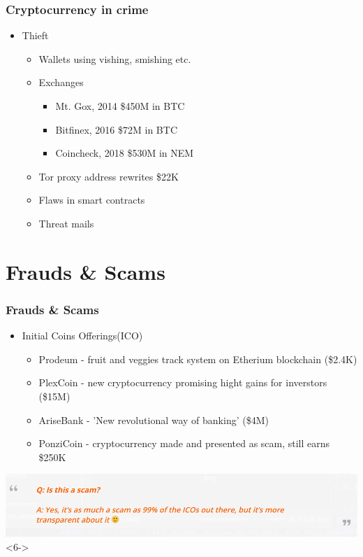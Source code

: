 \documentclass{beamer}
\begin{document}
\begin{frame}
    \frametitle{Cryptocurrency in crime}
        \begin{itemize}
            \item<1-> Thieft
            \begin{itemize}
                \item<2-> Wallets using vishing, smishing etc.
                \item<3-> Exchanges
                    \begin{itemize}
                        \item<4-> Mt. Gox,   2014 \$450M in BTC
                        \item<4-> Bitfinex,  2016 \$72M  in BTC
                        \item<4-> Coincheck, 2018 \$530M in NEM
                    \end{itemize}
                \item<5-> Tor proxy address rewrites \$22K
                \item<6-> Flaws in smart contracts
                \item<7-> Threat mails
            \end{itemize}
        \end{itemize}
\end{frame}
\section{Frauds \& Scams}
\begin{frame}
    \frametitle{Frauds \& Scams}
        \begin{itemize}
            \item<1-> Initial Coins Offerings(ICO)
                \begin{itemize}
                    \item<2-> Prodeum - fruit and veggies track system on Etherium blockchain (\$2.4K)
                    \item<3-> PlexCoin - new cryptocurrency promising hight gains for inverstors (\$15M)
                    \item<4-> AriseBank - 'New revolutional way of banking' (\$4M) 
                    \item<5-> PonziCoin - cryptocurrency made and presented as scam, still earns \$250K
                \end{itemize} 
            \end{itemize}
            \begin{center}
            \includegraphics[width=\textwidth]{ponzed.png}<6->     
            \end{center}         
\end{frame}
\end{document}
